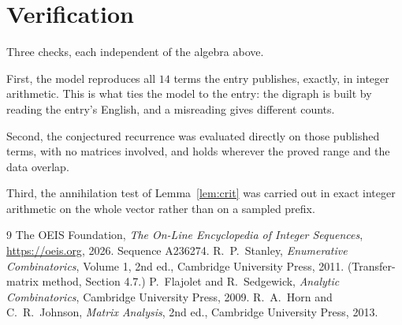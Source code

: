 \documentclass[11pt,a4paper]{article}
\theoremstyle{plain}
\theoremstyle{definition}
\begin{document}
\section{Verification}

Three checks, each independent of the algebra above.

First, the model reproduces all $14$ terms the entry publishes, exactly, in integer
arithmetic. This is what ties the model to the entry: the digraph is built by reading the
entry's English, and a misreading gives different counts.

Second, the conjectured recurrence was evaluated directly on those published terms, with no
matrices involved, and holds wherever the proved range and the data overlap.

Third, the annihilation test of Lemma~\ref{lem:crit} was carried out in exact integer
arithmetic on the whole vector rather than on a sampled prefix.

\begin{thebibliography}{9}
 The OEIS Foundation, \emph{The On-Line Encyclopedia of Integer
Sequences}, \url{https://oeis.org}, 2026. Sequence A236274.
 R.~P.~Stanley, \emph{Enumerative Combinatorics}, Volume 1, 2nd ed.,
Cambridge University Press, 2011. (Transfer-matrix method, Section 4.7.)
 P.~Flajolet and R.~Sedgewick, \emph{Analytic Combinatorics}, Cambridge
University Press, 2009.
 R.~A.~Horn and C.~R.~Johnson, \emph{Matrix Analysis}, 2nd ed., Cambridge
University Press, 2013.
\end{thebibliography}
\end{document}
